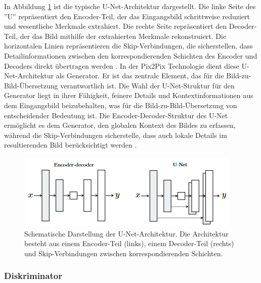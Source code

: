In Abbildung \ref{fig:unet} ist die typische U-Net-Architektur dargestellt. Die linke Seite des ''U'' repräsentiert den Encoder-Teil, der das Eingangsbild schrittweise reduziert und wesentliche Merkmale extrahiert. Die rechte Seite repräsentiert den Decoder-Teil, der das Bild mithilfe der extrahierten Merkmale rekonstruiert. Die horizontalen Linien repräsentieren die Skip-Verbindungen, die sicherstellen, dass Detailinformationen zwischen den korrespondierenden Schichten des Encoder und Decoders direkt übertragen werden \cite{PhillipIsola.}. \newline 
In der Pix2Pix Technologie dient diese U-Net-Architektur als Generator. Er ist das zentrale Element, das für die Bild-zu-Bild-Übersetzung verantwortlich ist. Die Wahl der U-Net-Struktur für den Generator liegt in ihrer Fähigkeit, feinere Details und Kontextinformationen aus dem Eingangsbild beizubehalten, was für die Bild-zu-Bild-Übersetzung von entscheidender Bedeutung ist. Die Encoder-Decoder-Struktur des U-Net ermöglicht es dem Generator, den globalen Kontext des Bildes zu erfassen, während die Skip-Verbindungen sicherstelle, dass auch lokale Details im resultierenden Bild berücksichtigt werden \cite{PhillipIsola.}.

\begin{figure}[h]
	\centering
	\includegraphics[width=0.7\linewidth]{./images/unet.png}
	\caption{Schematische Darstellung der U-Net-Architektur. Die Architektur besteht aus einem Encoder-Teil (links), einem Decoder-Teil (rechts) und Skip-Verbindungen zwischen korrespondierenden Schichten.}
	\label{fig:unet}
\end{figure}

\subsubsection{Diskriminator}

